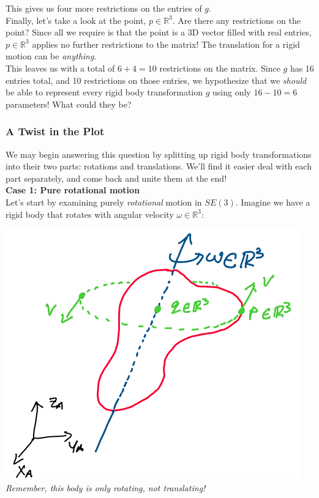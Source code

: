 \documentclass[oneside]{book}
\begin{document}
This gives us four more restrictions on the entries of $g$.\\
Finally, let's take a look at the point, $p \in \mathbb{R}^3$. Are there any restrictions on the point? Since all we require is that the point is a 3D vector filled with real entries, $p \in \mathbb{R}^3$ applies no further restrictions to the matrix! The translation for a rigid motion can be \textit{anything}.\\
This leaves us with a total of $6 + 4 = 10$ restrictions on the matrix. Since $g$ has 16 entries total, and 10 restrictions on those entries, we hypothesize that we \textit{should} be able to represent every rigid body transformation $g$ using only $16 - 10 = 6$ parameters! What could they be?

\subsubsection{A Twist in the Plot}
We may begin answering this question by splitting up rigid body transformations into their two parts: rotations and translations. We'll find it easier deal with each part separately, and come back and unite them at the end!\\
\textbf{Case 1: Pure rotational motion}\\
Let's start by examining purely \textit{rotational} motion in $SE(3)$. Imagine we have a rigid body that rotates with angular velocity $\omega \in \mathbb{R}^3$:
\begin{center}
    \includegraphics[scale=0.4]{images/rotating_body.png}\\
    \textit{Remember, this body is only rotating, not translating!}
\end{center}
\end{document}
